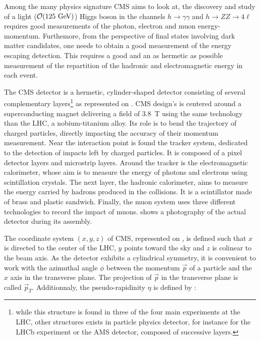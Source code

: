         Among the many physics signature CMS aims to look at, the discovery and study of a
        light ($\mathcal{O}(125 ~\text{GeV})$) Higgs boson in the channels $h\rightarrow\gamma\gamma$
        and $h\rightarrow ZZ \rightarrow 4\ell$ requires good measurements of the photon,
        electron and muon energy-momentum. Furthemore, from the perspective of final
        states involving dark matter candidates, one needs to obtain a good measurement
        of the energy escaping detection. This requires a good and an as hermetic as
        possible measurement of the repartition of the hadronic and electromagnetic energy
        in each event.


        The CMS detector is a hermetic, cylinder-shaped detector consisting of several
        complementary layers\footnote{while this structure is found in three of the four
        main experiments at the LHC, other structures exists in particle physics detector,
        for instance for the LHCb experiment or the AMS detector, composed of successive
        layers.} as represented on .
        CMS design's is centered around a superconducting magnet delivering a field of 3.8~T
        using the same technology than the LHC, a nobium-titanium alloy. Its role is to
        bend the trajectory of charged particles, directly impacting the accuracy of
        their momentum measurement. Near the interaction point is found the tracker system, dedicated to
        the detection of impacts left by charged particles. It is composed of a pixel detector
        layers and microstrip layers. Around the tracker is the electromagnetic
        calorimeter, whose aim is to measure the energy of photons and electrons using
        scintillation crystals. The next layer, the hadronic calorimeter, aims to measure
        the energy carried by hadrons produced in the collisions. It is a scintillator made
        of brass and plastic sandwich. Finally, the muon system uses three different
        technologies to record the impact of muons. 
        shows a photography of the actual detector during its assembly.


        The coordinate system $(x,y,z)$ of CMS, represented on ,
        is defined such that $x$ is directed to the center of the LHC, $y$ points toward
        the sky and $z$ is colinear to the beam axis. As the detector exhibits a
        cylindrical symmetry, it is convenient to work with the azimuthal angle $\phi$
        between the momentum $\vec{p}$ of a particle and the $x$ axis in the transverse
        plane. The projection of $\vec{p}$ in the transverse plane is called $\vec{p}_T$.
        Additionnaly, the pseudo-rapidinity $\eta$ is defined by :

